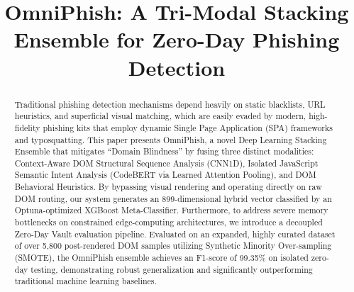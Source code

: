 \documentclass[conference]{IEEEtran}
\begin{document}
\title{OmniPhish: A Tri-Modal Stacking Ensemble for Zero-Day Phishing Detection\\
}

\author{
\and
{}
\and
{}
}

\maketitle

\begin{abstract}
Traditional phishing detection mechanisms depend heavily on static blacklists, URL heuristics, and superficial visual matching, which are easily evaded by modern, high-fidelity phishing kits that employ dynamic Single Page Application (SPA) frameworks and typosquatting. This paper presents OmniPhish, a novel Deep Learning Stacking Ensemble that mitigates ``Domain Blindness'' by fusing three distinct modalities: Context-Aware DOM Structural Sequence Analysis (CNN1D), Isolated JavaScript Semantic Intent Analysis (CodeBERT via Learned Attention Pooling), and DOM Behavioral Heuristics. By bypassing visual rendering and operating directly on raw DOM routing, our system generates an 899-dimensional hybrid vector classified by an Optuna-optimized XGBoost Meta-Classifier. Furthermore, to address severe memory bottlenecks on constrained edge-computing architectures, we introduce a decoupled Zero-Day Vault evaluation pipeline. Evaluated on an expanded, highly curated dataset of over 5,800 post-rendered DOM samples utilizing Synthetic Minority Over-sampling (SMOTE), the OmniPhish ensemble achieves an F1-score of 99.35\% on isolated zero-day testing, demonstrating robust generalization and significantly outperforming traditional machine learning baselines.
\end{abstract}
\end{document}
